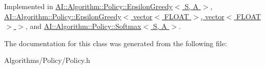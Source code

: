Implemented in \hyperlink{classAI_1_1Algorithm_1_1Policy_1_1EpsilonGreedy_a00a2dde7f4df14fd046e034694184f65}{A\+I\+::\+Algorithm\+::\+Policy\+::\+Epsilon\+Greedy$<$ S, A $>$}, \hyperlink{classAI_1_1Algorithm_1_1Policy_1_1EpsilonGreedy_a00a2dde7f4df14fd046e034694184f65}{A\+I\+::\+Algorithm\+::\+Policy\+::\+Epsilon\+Greedy$<$ vector$<$ F\+L\+O\+A\+T $>$, vector$<$ F\+L\+O\+A\+T $>$ $>$}, and \hyperlink{classAI_1_1Algorithm_1_1Policy_1_1Softmax_adf507bcadedab2d33e3fcc0059918d19}{A\+I\+::\+Algorithm\+::\+Policy\+::\+Softmax$<$ S, A $>$}.



The documentation for this class was generated from the following file\+:\begin{DoxyCompactItemize}
\item 
Algorithms/\+Policy/Policy.\+h\end{DoxyCompactItemize}
